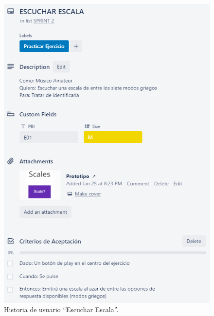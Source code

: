 \documentclass[12pt,twoside,titlepage]{report}
\begin{document}
{\begin{figure}[H]
    \centering
    \includegraphics[scale=1.3]{Scrum/User Stories/Escalas}
    \caption{Historia de usuario ``Escuchar Escala''.}
    \label{fig:Escalas}
\end{figure}

}
\end{document}

